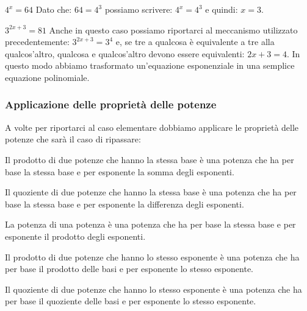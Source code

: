 \begin{esempio}
\(4^x=64\) Dato che: \(64=4^3\) possiamo scrivere: \(4^x=4^3\) 
e quindi: \(x=3\).
\end{esempio}

\begin{esempio}
\(3^{2x+3}=81\) Anche in questo caso possiamo riportarci al meccanismo 
utilizzato precedentemente: \(3^{2x+3}=3^4\) e, se tre a qualcosa è equivalente 
a tre alla qualcos'altro, qualcosa e qualcos'altro devono essere equivalenti: 
\({2x+3}=4\). In questo modo abbiamo trasformato un'equazione esponenziale in 
una semplice equazione polinomiale.
\end{esempio}

\subsubsection{Applicazione delle proprietà delle potenze}
\label{subsubsec:esplog_eq_proprpot}

A volte per riportarci al caso elementare dobbiamo applicare le proprietà delle 
potenze che sarà il caso di ripassare:

\begin{description} [nosep]%
 \item [\(a^m \cdot a^n = a^{m+n}\)]
 Il prodotto di due  potenze che hanno la stessa base è una potenza che ha per 
base la stessa base e per esponente la somma degli esponenti.
 \item [\(a^m \div a^n = a^{m-n}\)]
 Il quoziente di due  potenze che hanno la stessa base è una potenza che ha per 
base la stessa base e per esponente la differenza degli esponenti.
 \item [\(\tonda{a^m}^n = a^{m \cdot n}\)]
 La potenza di una potenza è una potenza che ha per base la stessa base e per 
esponente il prodotto degli esponenti.
 \item [\(a^n \cdot b^n = \tonda{a \cdot b}^n\)]
 Il prodotto di due  potenze che hanno lo stesso esponente è una potenza che ha 
per base il prodotto delle basi e per esponente lo stesso esponente.
 \item [\(a^n \div b^n = \tonda{a \div b}^n\)]
 Il quoziente di due  potenze che hanno lo stesso esponente è una potenza che 
ha per base il quoziente delle basi e per esponente lo stesso esponente.
\end{description}

